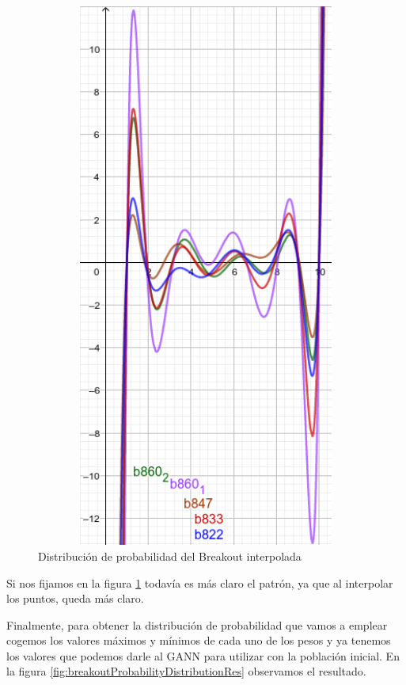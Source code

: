 \begin{figure}
    \centering
    
    \includegraphics[width=1\textwidth,height=18cm]{Figures/breakoutProbabilityDistributionInterpolated}
    
    \caption{Distribución de probabilidad del Breakout interpolada}
    \label{fig:breakoutProbabilityDistributionInterpolated}
\end{figure}

Si nos fijamos en la figura \ref{fig:breakoutProbabilityDistributionInterpolated} todavía es más claro el patrón, ya que al interpolar los puntos, queda más claro.

\newpage
Finalmente, para obtener la distribución de probabilidad que vamos a emplear cogemos los valores máximos y mínimos de cada uno de los pesos y ya tenemos los valores que podemos darle al GANN para utilizar con la población inicial. En la figura \ref{fig:breakoutProbabilityDistributionRes} observamos el resultado.

